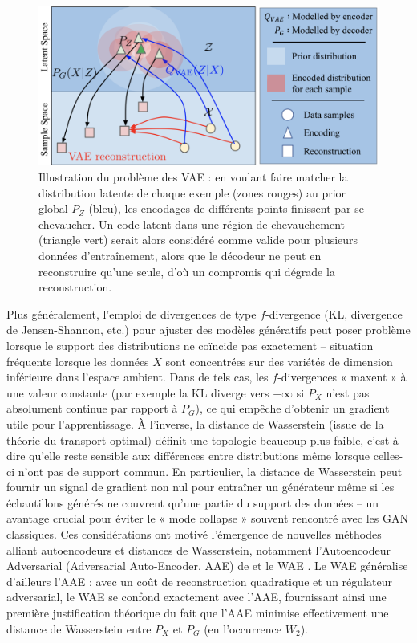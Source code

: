 \begin{figure}[H]
    \centering
    \includegraphics[width=1.0\linewidth]{images/pb_vae.png}
    \caption{\justifying Illustration du problème des VAE : en voulant faire matcher la distribution latente de chaque exemple (zones rouges) au prior global $P_Z$ (bleu), les encodages de différents points finissent par se chevaucher. Un code latent dans une région de chevauchement (triangle vert) serait alors considéré comme valide pour plusieurs données d’entraînement, alors que le décodeur ne peut en reconstruire qu’une seule, d’où un compromis qui dégrade la reconstruction.}
    \label{fig:enter-label}
\end{figure}

Plus généralement, l’emploi de divergences de type $f$-divergence (KL, divergence de Jensen-Shannon, etc.) pour ajuster des modèles génératifs peut poser problème lorsque le support des distributions ne coïncide pas exactement – situation fréquente lorsque les données $X$ sont concentrées sur des variétés de dimension inférieure dans l’espace ambient. Dans de tels cas, les $f$-divergences « maxent » à une valeur constante (par exemple la KL diverge vers $+\infty$ si $P_X$ n’est pas absolument continue par rapport à $P_G$), ce qui empêche d’obtenir un gradient utile pour l’apprentissage. À l’inverse, la distance de Wasserstein (issue de la théorie du transport optimal) définit une topologie beaucoup plus faible, c’est-à-dire qu’elle reste sensible aux différences entre distributions même lorsque celles-ci n’ont pas de support commun. En particulier, la distance de Wasserstein peut fournir un signal de gradient non nul pour entraîner un générateur même si les échantillons générés ne couvrent qu’une partie du support des données – un avantage crucial pour éviter le « mode collapse » souvent rencontré avec les GAN classiques. Ces considérations ont motivé l’émergence de nouvelles méthodes alliant autoencodeurs et distances de Wasserstein, notamment l’Autoencodeur Adversarial (Adversarial Auto-Encoder, AAE) de \citep{makhzani2016adversarial} et le WAE \citep{tolstikhin2018wasserstein}. Le WAE généralise d’ailleurs l’AAE : avec un coût de reconstruction quadratique et un régulateur adversarial, le WAE se confond exactement avec l’AAE, fournissant ainsi une première justification théorique du fait que l’AAE minimise effectivement une distance de Wasserstein entre $P_X$ et $P_G$ (en l’occurrence $W_2$).\\

